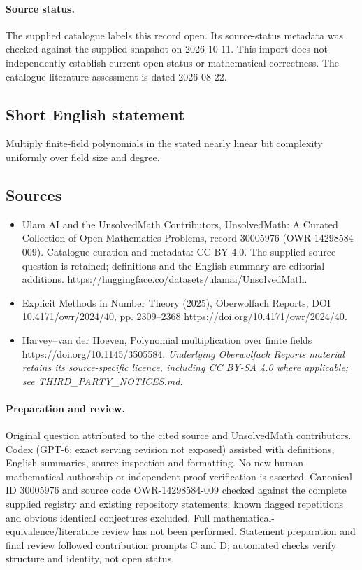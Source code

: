 \documentclass[11pt]{article}
\begin{document}
\paragraph{Source status.}
The supplied catalogue labels this record open. Its source-status metadata was checked against the supplied snapshot on 2026-10-11. This import does not independently establish current open status or mathematical correctness. The catalogue literature assessment is dated 2026-08-22.
\subsection{Short English statement}
Multiply finite-field polynomials in the stated nearly linear bit complexity uniformly over field size and degree.
\subsection{Sources}
\begin{itemize}
\item[S1] Ulam AI and the UnsolvedMath Contributors, UnsolvedMath: A Curated Collection of Open Mathematics Problems, record 30005976 (OWR-14298584-009). Catalogue curation and metadata: CC BY 4.0. The supplied source question is retained; definitions and the English summary are editorial additions.
\url{https://huggingface.co/datasets/ulamai/UnsolvedMath}.
\item[S2] Explicit Methods in Number Theory (2025), Oberwolfach Reports, DOI 10.4171/owr/2024/40, pp. 2309--2368
\url{https://doi.org/10.4171/owr/2024/40}.
\item[S3] Harvey--van der Hoeven, Polynomial multiplication over finite fields
\url{https://doi.org/10.1145/3505584}.
\textit{Underlying Oberwolfach Reports material retains its source-specific licence, including CC BY-SA 4.0 where applicable; see THIRD\_PARTY\_NOTICES.md.}
\end{itemize}
\paragraph{Preparation and review.}
Original question attributed to the cited source and UnsolvedMath contributors. Codex (GPT-6; exact serving revision not exposed) assisted with definitions, English summaries, source inspection and formatting. No new human mathematical authorship or independent proof verification is asserted. Canonical ID 30005976 and source code OWR-14298584-009 checked against the complete supplied registry and existing repository statements; known flagged repetitions and obvious identical conjectures excluded. Full mathematical-equivalence/literature review has not been performed. Statement preparation and final review followed contribution prompts C and D; automated checks verify structure and identity, not open status.
\label{end:30005976}
\end{document}
